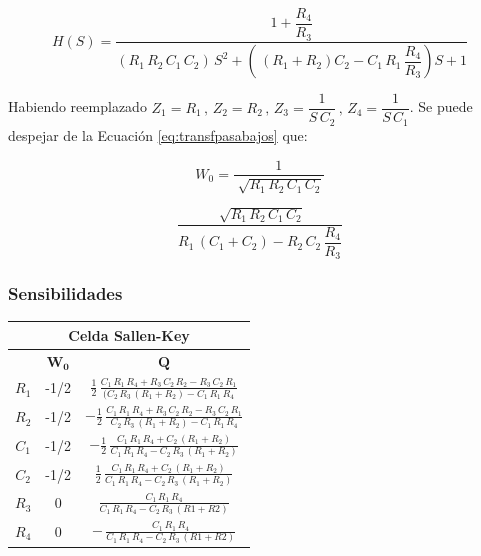 \documentclass[11pt, a4paper]{article}
\begin{document}
\begin{equation} 
	H(S) = \dfrac{1+ \dfrac{R_4}{R_3}}{\left(R_1 \, R_2 \, C_1 \, C_2 \right) \, S^2 + \left( \, \left(R_1 + R_2 \right) C_2 - C_1 \, R_1 \, \dfrac{R_4}{R_3} \right) S +1}	
	\label{eq:transfpasabajos}
\end{equation}
	
	Habiendo reemplazado $Z_1 = R_1 \, , \, Z_2 = R_2 \, , \, Z_3 = \dfrac{1}{S \, C_2} \, , \, Z_4 = \dfrac{1}{S \, C_1}$. 
	Se puede despejar de la Ecuación \ref{eq:transfpasabajos} que:

\begin{equation}
W_0 = \dfrac{1}{\sqrt[]{R_1 \, R_2 \, C_1 \, C_2}}
	\label{eq:freqdecorte}
\end{equation}	

\begin{equation}
\dfrac{\sqrt[]{R_1 \, R_2 \, C_1 \, C_2}}{R_1 \, (C_1 + C_2) - R_2 \, C_2 \, \dfrac{R_4}{R_3}}
	\label{eq:Q}
\end{equation}

\subsubsection{Sensibilidades}


\begin{table}[H]
\centering
\begin{tabular}{|c|c|c|}
\hline
\multicolumn{3}{|c|}{\textbf{Celda Sallen-Key}} 	\\ \hline
               & $\mathbf{W_0}$  & $\mathbf{Q}$   	\\ \hline
$R_1$             & -1/2           & $\frac{1}{2} \, \frac{C_1 
\, R_1 \, R_4 + R_3 \, C_2 \, R_2 - R_3 \, C_2 \, R_1}{(C_2 \, R_3 \, (R_1+R_2)- C_1 \, R_1 \, R_4}$            \\ \hline
$R_2$             & -1/2            & $- \frac{1}{2} \, \frac{C_1 
\, R_1 \, R_4 + R_3 \, C_2 \, R_2 - R_3 \, C_2 \, R_1}{C_2 \, R_3 \, (R_1+R_2)- C_1 \, R_1 \, R_4}$            \\ \hline
$C_1$             & -1/2            & $- \frac{1}{2} \, \frac{C_1 \, R_1 \, R_4 + C_2 \, (R_1+R_2)}{C_1 \, R_1 \, R_4 - C_2 \, R_3 \,(R_1+R_2)}$            	\\ \hline
$C_2$             & -1/2            & $\frac{1}{2} \, \frac{C_1 \, R_1 \, R_4 + C_2 \, (R_1+R_2)}{C_1 \, R_1 \, R_4 - C_2 \, R_3 \,(R_1+R_2)}$            	\\ \hline
$R_3$             & 0               & $\frac{C_1 \, R_1 \, R_4}{C_1 \, R_1 \, R_4 - C_2 \, R_3 \, (R1+R2)}$            \\ \hline
$R_4$             & 0               & $- \, \frac{C_1 \, R_1 \, R_4}{C_1 \, R_1 \, R_4 - C_2 \, R_3 \, (R1+R2)}$            \\ \hline
\end{tabular}
\end{table}
\end{document}
